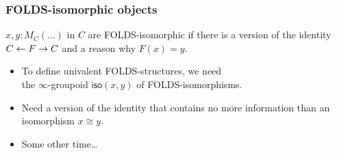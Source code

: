 \documentclass{beamer}
\newcommand{\blank}{\mathord{\hspace{1pt}\text{--}\hspace{1pt}}}
\begin{document}
\begin{frame}
  \frametitle{FOLDS-isomorphic objects}
  \begin{definition}
    $x,y:M_C(\dots)$ in $C$ are \alert<1>{FOLDS-isomorphic} if there is a version of the identity $C\leftarrow F \to C$ and a reason why $F(x)=y$.
  \end{definition}
  \pause
  \begin{itemize}
  \item To define univalent FOLDS-structures, we need\\ \alert<2>{the $\infty$-groupoid} $\mathsf{iso}(x,y)$ of FOLDS-isomorphisms.
  \item Need a version of the identity that contains \alert<2>{no more information} than an isomorphism $x\cong y$.
  \item Some other time\dots
  \end{itemize}
\end{frame}

\end{document}
